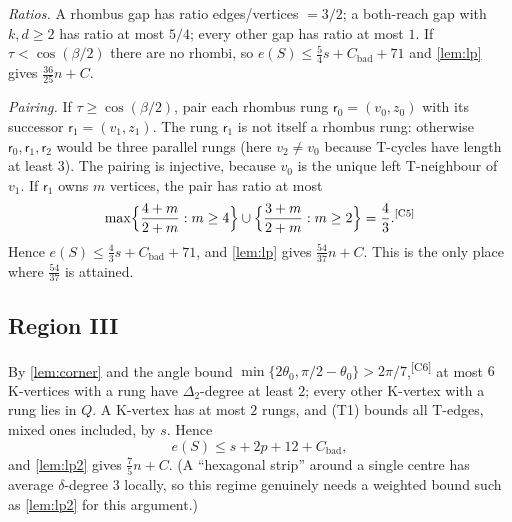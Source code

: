 \documentclass[11pt]{amsart}
\theoremstyle{definition}
\theoremstyle{remark}
\newcommand{\Dt}{\Delta_2}
\newcommand{\chk}[1]{\textsuperscript{[#1]}}
\begin{document}
\emph{Ratios.} A rhombus gap has ratio edges/vertices $=3/2$; a both-reach gap with $k,d\ge2$ has ratio at most $5/4$; every other gap has ratio at most $1$. If $\tau<\cos(\beta/2)$ there are no rhombi, so $e(S)\le\frac54s+C_{\mathrm{bad}}+71$ and \cref{lem:lp} gives $\frac{36}{25}n+C$.

\emph{Pairing.} If $\tau\ge\cos(\beta/2)$, pair each rhombus rung $\mathsf r_0=(v_0,z_0)$ with its successor $\mathsf r_1=(v_1,z_1)$. The rung $\mathsf r_1$ is not itself a rhombus rung: otherwise $\mathsf r_0,\mathsf r_1,\mathsf r_2$ would be three parallel rungs (here $v_2\neq v_0$ because T-cycles have length at least $3$). The pairing is injective, because $v_0$ is the unique left T-neighbour of $v_1$. If $\mathsf r_1$ owns $m$ vertices, the pair has ratio at most
\[
\max\Bigl\{\frac{4+m}{2+m}: m\ge4\Bigr\}\cup\Bigl\{\frac{3+m}{2+m}: m\ge2\Bigr\}=\frac43 .\chk{C5}
\]
Hence $e(S)\le\frac43s+C_{\mathrm{bad}}+71$, and \cref{lem:lp} gives $\frac{54}{37}n+C$. This is the only place where $\frac{54}{37}$ is attained.

\subsection*{Region III}
By \cref{lem:corner} and the angle bound $\min\{2\theta_0,\pi/2-\theta_0\}>2\pi/7$,\chk{C6} at most $6$ K-vertices with a rung have $\Dt$-degree at least $2$; every other K-vertex with a rung lies in $Q$. A K-vertex has at most $2$ rungs, and (T1) bounds all T-edges, mixed ones included, by $s$. Hence
\[
e(S)\le s+2p+12+C_{\mathrm{bad}},
\]
and \cref{lem:lp2} gives $\frac75n+C$. (A ``hexagonal strip'' around a single centre has average $\delta$-degree $3$ locally, so this regime genuinely needs a weighted bound such as \cref{lem:lp2} for this argument.)
\end{document}
